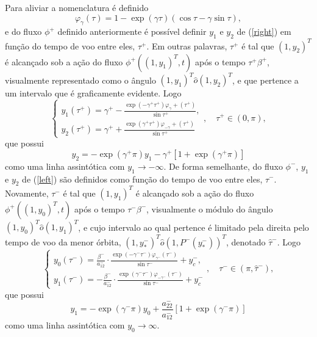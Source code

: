 Para aliviar a nomenclatura é definido
\begin{equation}
\label{phi}
\varphi_{\gamma}(\tau)=1-\exp (\gamma \tau) (\cos \tau-\gamma \sin \tau),
\end{equation}
e do fluxo $\phi^+$ definido anteriormente é possível definir $y_1$ e $y_2$ de (\ref{right}) em função do tempo de voo entre eles, $\tau^{+}$. Em outras palavras, $\tau^{+}$ é tal que $(1,y_2)^T$ é alcançado sob a ação do fluxo $\phi^+((1,y_1)^T, t)$ após o tempo $\tau^{+}\beta^+$, visualmente representado como o ângulo $(1,y_1)^T\hat{o}(1,y_2)^T$, e que pertence a um intervalo que é graficamente evidente. Logo
\begin{equation}
\label{righttime}
\left\{\begin{array}{l}
y_{1}\left(\tau^{+}\right)=\gamma^{+}-\frac{\exp \left(-\gamma^{+} \tau^{+}\right) \varphi_{\gamma}+\left(\tau^{+}\right)}{\sin \tau^{+}}, \\
y_{2}\left(\tau^{+}\right)=\gamma^{+}+\frac{\exp \left(\gamma^{+} \tau^{+}\right)  \varphi_{-\gamma}+\left(\tau^{+}\right)}{\sin \tau^{+}}
\end{array}, \quad \tau^{+} \in(0, \pi)\right.,
\end{equation}
que possui
$$
y_{2}=-\exp \left(\gamma^{+} \pi\right) y_{1}-\gamma^{+}\left[1+\exp \left(\gamma^{+} \pi\right)\right]
$$
como uma linha assintótica com  $y_{1} \to-\infty$. De forma semelhante, do fluxo $\phi^-$, $y_1$ e $y_2$ de (\ref{left}) são definidos como função do tempo de voo entre eles, $\tau^{-}$. Novamente, $\tau^{-}$ é tal que $(1,y_1)^T$ é alcançado sob a ação do fluxo $\phi^+((1,y_0)^T, t)$ após o tempo $\tau^{-}\beta^-$, visualmente o módulo do ângulo $(1,y_0)^T\hat{o}(1,y_1)^T$, e cujo intervalo ao qual pertence é limitado pela direita pelo tempo de voo da menor órbita, $(1,y_*^-)^T\hat{o}(1,P^-(y_*^-))^T$, denotado $\hat{\tau}^{-}$. Logo
\begin{equation}
\label{lefttime}
\left\{\begin{array}{l}
y_{0}\left(\tau^{-}\right)=\frac{\beta^{-}}{a_{12}^{-}} \cdot \frac{\exp \left(-\gamma^{-} \tau^{-}\right)  \varphi_{\gamma^{-}}\left(\tau^{-}\right)}{\sin \tau^{-}}+y_{c}^{-}, \\
y_{1}\left(\tau^{-}\right)=-\frac{\beta^{-}}{a_{12}^{-}} \cdot \frac{\exp \left(\gamma^{-} \tau^{-}\right)  \varphi_{-\gamma^{-}}\left(\tau^{-}\right)}{\sin \tau^{-}}+y_{c}^{-}
\end{array}\right., \quad \tau^{-} \in\left(\pi, \hat{\tau}^{-}\right),
\end{equation}
que possui
\begin{equation}
\label{assin}
 y_{1}=-\exp \left(\gamma^{-} \pi\right)  y_{0}+\frac{a_{22}^{-}}{a_{12}^{-}} \left[1+\exp \left(\gamma^{-} \pi\right)\right]
\end{equation}
como uma linha assintótica com  $y_{0} \to\infty$. 

